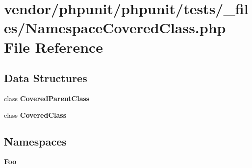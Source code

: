 \section{vendor/phpunit/phpunit/tests/\+\_\+files/\+Namespace\+Covered\+Class.php File Reference}
\label{phpunit_2tests_2__files_2_namespace_covered_class_8php}
\subsection*{Data Structures}
\begin{DoxyCompactItemize}
\item 
class {\bf Covered\+Parent\+Class}
\item 
class {\bf Covered\+Class}
\end{DoxyCompactItemize}
\subsection*{Namespaces}
\begin{DoxyCompactItemize}
\item 
 {\bf Foo}
\end{DoxyCompactItemize}
